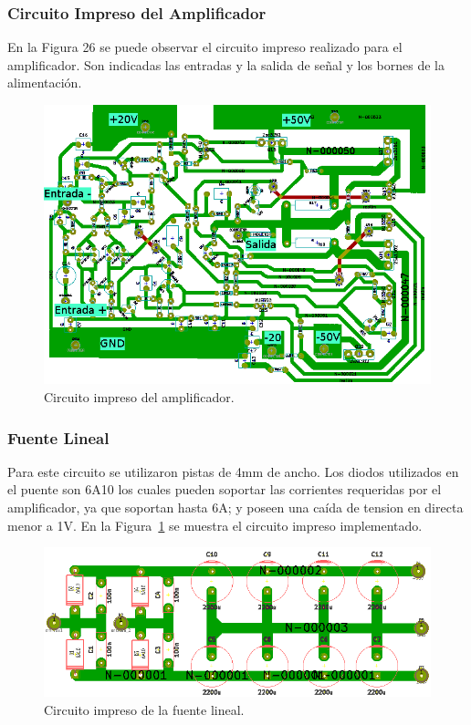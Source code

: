 \bigskip
\subsubsection{Circuito Impreso del Amplificador}

En la Figura 26 se puede observar el circuito impreso realizado para el amplificador. Son indicadas las entradas y la salida de señal y los bornes de la alimentación.
\medskip
\begin{figure}[H]
\centerline{
\includegraphics[width=1\textwidth]{img/PCB1.png}}
\caption{Circuito impreso del amplificador.}
\end{figure}

\bigskip
\subsubsection{Fuente Lineal}
\medskip
Para este circuito se utilizaron pistas de 4mm de ancho. Los diodos utilizados en el puente son 6A10 los cuales pueden soportar las corrientes requeridas por el amplificador, ya que soportan hasta 6A; y poseen una caída de tension en directa menor a 1V.
En la Figura~\ref{circuito_impreso_fuente_lineal} se muestra el circuito impreso implementado. 



\begin{figure}[H]
\centering
\centerline{\includegraphics[width=1\textwidth]{img/circuito_impreso_fuente_lineal.png}}
\caption{Circuito impreso de la fuente lineal.}
\label{circuito_impreso_fuente_lineal} 
\end{figure}
\bigskip

